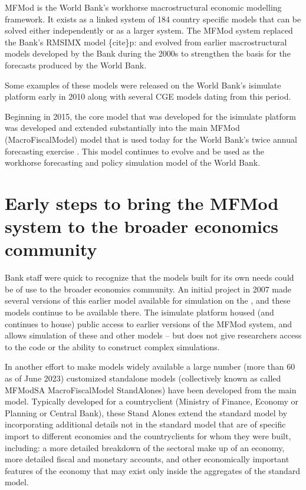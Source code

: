 \documentclass[letterpaper,10pt,english]{jupyterBook}
\begin{document}
\sphinxAtStartPar
MFMod is the World Bank’s work\sphinxhyphen{}horse macro\sphinxhyphen{}structural economic modelling framework. It exists as a linked system of 184 country specific models that can be solved either independently or as a larger system. The MFMod system replaced the Bank’s RMSIM\sphinxhyphen{}X model \{cite\}p:   and evolved from earlier macro\sphinxhyphen{}structural models developed by the Bank during the 2000s to strengthen the basis for the forecasts produced by the World Bank.

\sphinxAtStartPar
Some examples of these models were released on the World Bank’s isimulate platform early in 2010 along with several CGE models dating from this period.

\sphinxAtStartPar
Beginning in 2015, the core model that was developed for the isimulate platform was developed and extended substantially into the main MFMod (MacroFiscalModel) model that is used today for the World Bank’s twice annual forecasting exercise .  This model continues to evolve and be used as the workhorse forecasting and policy simulation model of the World Bank.


\section{Early steps to bring the MFMod system to the broader economics community}
\label{\detokenize{content/01_Introduction/Introduction:early-steps-to-bring-the-mfmod-system-to-the-broader-economics-community}}
\sphinxAtStartPar
Bank staff were quick to recognize that the models built for its own needs could be of use to the broader economics community. An initial project  in 2007 made several versions of this earlier model available for simulation on the , and these models continue to be available there.  The isimulate platform housed (and continues to house) public access to earlier versions of the MFMod system, and allows simulation of these and other models – but does not give researchers access to the code or the ability to construct complex simulations.

\sphinxAtStartPar
In another effort to make models widely available a large number (more than 60 as of June 2023) customized stand\sphinxhyphen{}alone models (collectively known as called MFModSA \sphinxhyphen{} MacroFiscalModel StandAlones)  have been developed from the main model. Typically developed for a country\sphinxhyphen{}client (Ministry of Finance, Economy or Planning or Central Bank), these Stand Alones extend the standard model by incorporating additional details not in the standard model that are of specific import to different economies and the country\sphinxhyphen{}clients for whom they were built, including: a more detailed breakdown of the sectoral make up of an economy, more detailed fiscal and monetary accounts, and other economically important features of the economy that may exist only inside the aggregates of the standard model.
\end{document}
